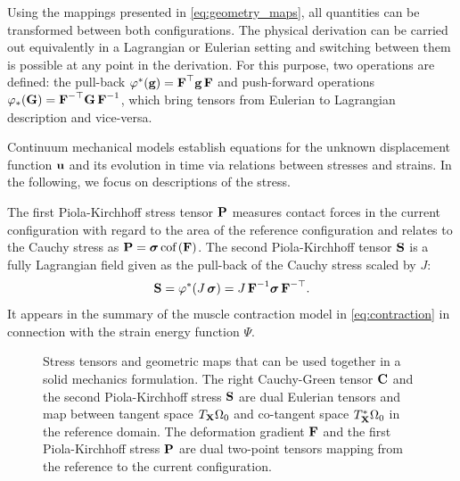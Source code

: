 Using the mappings presented in \cref{eq:geometry_maps}, all quantities can be transformed between both configurations. 
The physical derivation can be carried out equivalently in a Lagrangian or Eulerian setting and switching between them is possible at any point in the derivation. For this purpose, two operations are defined: the pull-back $\varphi^\ast(\textbf{g}) = \textbf{F}^\top\textbf{g}\,\textbf{F}$ and push-forward operations $\varphi_\ast(\textbf{G}) = \textbf{F}^{-\top}\textbf{G}\,\textbf{F}^{-1}$, which bring tensors from Eulerian to Lagrangian description and vice-versa.

Continuum mechanical models establish equations for the unknown displacement function $\textbf{u}$ and its evolution in time via relations between stresses and strains. In the following, we focus on descriptions of the stress.

The first Piola-Kirchhoff stress tensor $\textbf{P}$ measures contact forces in the current configuration with regard to the area of the reference configuration and relates to the Cauchy stress as $\textbf{P} = \boldsymbol{\sigma}\,\hbox{cof} \,(\textbf{F})$. The second Piola-Kirchhoff tensor $\textbf{S}$ is a fully Lagrangian field given as the pull-back of the Cauchy stress scaled by $J$:%
\begin{align*}
  \textbf{S} = \varphi^\ast(J\,\boldsymbol{\sigma}) = J\,\textbf{F}^{-1}\boldsymbol{\sigma}\,\textbf{F}^{-\top}.
\end{align*}
It appears in the summary of the muscle contraction model in \cref{eq:contraction} in connection with the strain energy function $\Psi$.

\begin{figure}
  \centering%
  \def\svgwidth{0.5\textwidth}
  \caption{Stress tensors and geometric maps that can be used together in a solid mechanics formulation. The right Cauchy-Green tensor $\textbf{C}$  and the second Piola-Kirchhoff stress $\textbf{S}$ are dual Eulerian tensors and map between tangent space $T_{\textbf{X}}\Omega_0$ and co-tangent space $T^\ast_{\textbf{X}}\Omega_0$ in the reference domain. The deformation gradient $\textbf{F}$ and the first Piola-Kirchhoff stress $\textbf{P}$ are dual two-point tensors mapping from the reference to the current configuration. 
  }%
  \label{fig:stress_tensors}%
\end{figure}

